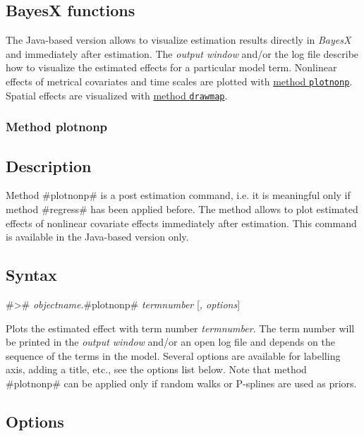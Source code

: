 \subsection{BayesX functions}
\label{remlregbayesxplot}

The Java-based version allows to visualize estimation results
directly in {\em BayesX} and immediately after estimation. The
{\em output window} and/or the log file describe how to visualize
the estimated effects for a particular model term. Nonlinear
effects of metrical covariates and time scales are plotted with
\hyperref[remlregplotnonp]{method \texttt{plotnonp}}. Spatial
effects are visualized with \hyperref[remlregdrawmap]{method
\texttt{drawmap}}.

\subsubsection{Method plotnonp}
\label{remlregplotnonp} 

\subsection*{Description}

Method #plotnonp# is a post estimation command, i.e. it is
meaningful only if method #regress# has been applied before. The
method allows to plot estimated effects of nonlinear covariate
effects immediately after estimation. This command is available in
the Java-based version only.

\subsection*{Syntax}

#># {\em objectname}.#plotnonp# {\em termnumber} [{\em , options}]

Plots the estimated effect with term number {\em termnumber}. The
term number will be printed in the {\em output window} and/or an
open log file and depends on the sequence of the terms in the
model. Several options are available for labelling axis, adding a
title, etc., see the options list below. Note that method
#plotnonp# can be applied only if random walks or P-splines are
used as priors.

\subsection*{Options}


